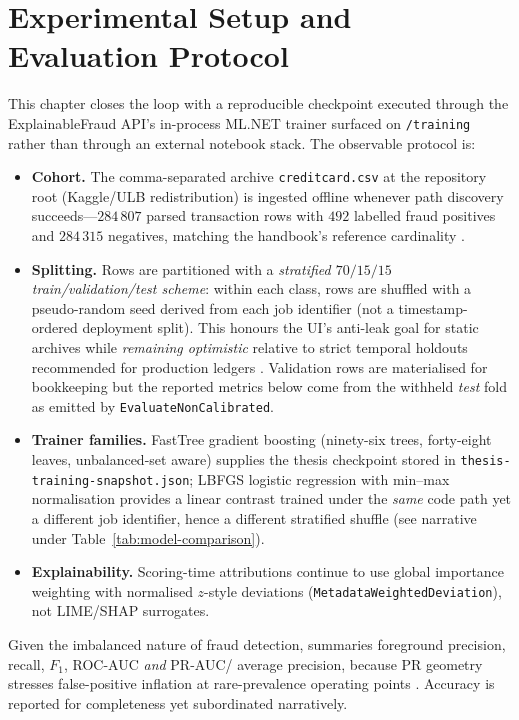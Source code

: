 \section{Experimental Setup and Evaluation Protocol}
This chapter closes the loop with a reproducible checkpoint executed through the ExplainableFraud API's in-process ML.NET trainer surfaced on \texttt{/training} rather than through an external notebook stack. The observable protocol is:
\begin{itemize}
    \item \textbf{Cohort.} The comma-separated archive \texttt{creditcard.csv} at the repository root (Kaggle/ULB redistribution) is ingested offline whenever path discovery succeeds---$284\,807$ parsed transaction rows with $492$ labelled fraud positives and $284\,315$ negatives, matching the handbook's reference cardinality \cite{fraud_handbook,credit_card_dataset,kaggle_creditcard_ulb}.
    \item \textbf{Splitting.} Rows are partitioned with a \emph{stratified $70/15/15$ train/validation/test scheme}: within each class, rows are shuffled with a pseudo-random seed derived from each job identifier (not a timestamp-ordered deployment split). This honours the UI's anti-leak goal for static archives while \emph{remaining optimistic} relative to strict temporal holdouts recommended for production ledgers \cite{fraud_handbook}. Validation rows are materialised for bookkeeping but the reported metrics below come from the withheld \emph{test} fold as emitted by \texttt{EvaluateNonCalibrated}.
    \item \textbf{Trainer families.} FastTree gradient boosting (ninety-six trees, forty-eight leaves, unbalanced-set aware) supplies the thesis checkpoint stored in \texttt{thesis-training-snapshot.json}; LBFGS logistic regression with min--max normalisation provides a linear contrast trained under the \emph{same} code path yet a different job identifier, hence a different stratified shuffle (see narrative under Table~\ref{tab:model-comparison}).
    \item \textbf{Explainability.} Scoring-time attributions continue to use global importance weighting with normalised $z$-style deviations (\texttt{MetadataWeightedDeviation}), not LIME/SHAP surrogates.
\end{itemize}

Given the imbalanced nature of fraud detection, summaries foreground precision, recall, $F_{1}$, ROC-AUC \emph{and} PR-AUC/ average precision, because PR geometry stresses false-positive inflation at rare-prevalence operating points \cite{davis_goadrich_icml06,fraud_handbook}. Accuracy is reported for completeness yet subordinated narratively.

